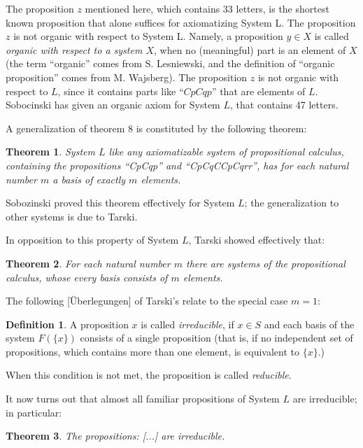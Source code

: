 \documentclass{article}
\newtheorem{theorem}{Theorem}
\theoremstyle{definition}
\newtheorem{definition}{Definition}
\begin{document}
The proposition $z$ mentioned here, which contains 33 letters, is the shortest known proposition that alone suffices for axiomatizing System L. The proposition $z$ is not organic with respect to System L. Namely, a proposition $y\in X$ is called \emph{organic with respect to a system $X$}, when no (meaningful) part is an element of $X$ (the term ``organic'' comes from S. Lesniewski, and the definition of ``organic proposition'' comes from M. Wajsberg). The proposition $z$ is not organic with respect to $L$, since it contains parts like ``$CpCqp$'' that are elements of $L$. Sobocinski has given an organic axiom for System $L$, that contains 47 letters.

A generalization of theorem 8 is constituted by the following theorem:

\begin{theorem}
  System $L$ like any axiomatizable system of propositional calculus, containing the propositions ``CpCqp'' and ``CpCqCCpCqrr'', has for each natural number $m$ a basis of exactly $m$ elements.
\end{theorem}

Sobozinski proved this theorem effectively for System $L$; the generalization to other systems is due to Tarski.

In opposition to this property of System $L$, Tarski showed effectively that:

\begin{theorem}
  For each natural number $m$ there are systems of the propositional calculus, whose \emph{every} basis consists of $m$ elements.
\end{theorem}

The following [Überlegungen] of Tarski's relate to the special case $m=1$:

\begin{definition}
  A proposition $x$ is called \emph{irreducible}, if $x\in S$ and each basis of the system $F(\{x\})$ consists of a single proposition (that is, if no independent set of propositions, which contains more than one element, is equivalent to $\{x\}$.)

  When this condition is not met, the proposition is called \emph{reducible}.
\end{definition}

It now turns out that almost all familiar propositions of System $L$ are irreducible; in particular:

\begin{theorem}
  The propositions:
  [...]
  are irreducible.
\end{theorem}
\end{document}
